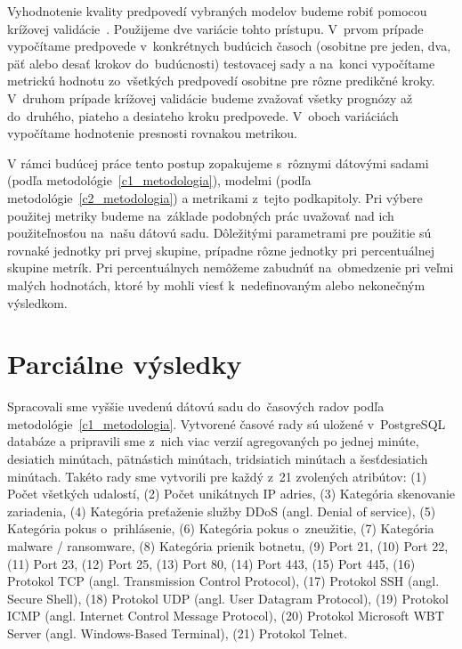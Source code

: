 \documentclass[thesismargins, thesislinespacing, openright, upjsfrontpage]{rnthesis}
\begin{document}
Vyhodnotenie kvality predpovedí vybraných modelov budeme robiť pomocou krížovej validácie~\cite{hyndman2018forecasting}. Použijeme dve variácie tohto prístupu. V~prvom prípade vypočítame predpovede v~konkrétnych budúcich časoch (osobitne pre jeden, dva, päť alebo desať krokov do~budúcnosti) testovacej sady a na~konci vypočítame metrickú hodnotu zo~všetkých predpovedí osobitne pre rôzne predikčné kroky. V~druhom prípade krížovej validácie budeme zvažovať všetky prognózy až do~druhého, piateho a desiateho kroku predpovede. V~oboch variáciách vypočítame hodnotenie presnosti rovnakou metrikou.

V rámci budúcej práce tento postup zopakujeme s~rôznymi dátovými sadami (podľa metodológie~\ref{c1_metodologia}), modelmi (podľa metodológie~\ref{c2_metodologia}) a metrikami z~tejto podkapitoly. Pri výbere použitej metriky budeme na~základe podobných prác uvažovať nad ich použiteľnosťou na~našu dátovú sadu. Dôležitými parametrami pre použitie sú rovnaké jednotky pri prvej skupine, prípadne rôzne jednotky pri percentuálnej skupine metrík. Pri percentuálnych nemôžeme zabudnúť na~obmedzenie pri veľmi malých hodnotách, ktoré by mohli viesť k~nedefinovaným alebo nekonečným výsledkom.

\chapter{Parciálne výsledky}

Spracovali sme vyššie uvedenú dátovú sadu do~časových radov podľa metodológie~\ref{c1_metodologia}. Vytvorené časové rady sú uložené v~PostgreSQL databáze a pripravili sme z~nich viac verzií agregovaných po jednej minúte, desiatich minútach, pätnástich minútach, tridsiatich minútach a šesťdesiatich minútach. Takéto rady sme vytvorili pre každý z~21 zvolených atribútov: (1) Počet všetkých udalostí, (2) Počet unikátnych IP adries, (3)  Kategória skenovanie zariadenia, (4) Kategória preťaženie služby DDoS (angl. Denial of service), (5) Kategória pokus o~prihlásenie, (6) Kategória pokus o~zneužitie, (7) Kategória malware / ransomware, (8) Kategória prienik botnetu, (9) Port 21, (10) Port 22, (11) Port 23, (12) Port 25, (13) Port 80, (14) Port 443, (15) Port 445, (16) Protokol TCP (angl. Transmission Control Protocol), (17) Protokol SSH (angl. Secure Shell), (18) Protokol UDP (angl. User Datagram Protocol), (19) Protokol ICMP (angl. Internet Control Message Protocol), (20) Protokol Microsoft WBT Server (angl. Windows-Based Terminal), (21) Protokol Telnet.
\end{document}
